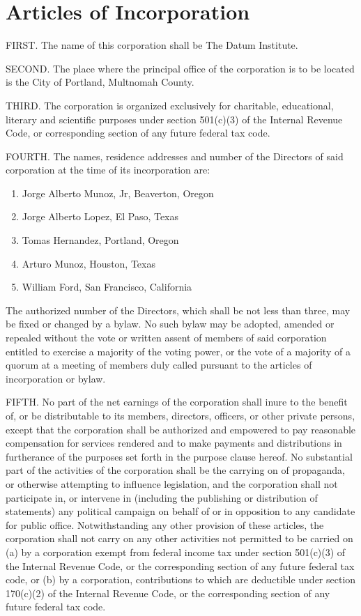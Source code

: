 \section{Articles of Incorporation}

FIRST. The name of this corporation shall be The Datum Institute.

SECOND. The place where the principal office of the corporation is to be located is the City of Portland, Multnomah County.

THIRD. The corporation is organized exclusively for charitable, educational, literary and scientific purposes under section 501(c)(3) of the Internal Revenue Code, or corresponding section of any future federal tax code. 

FOURTH. The names, residence addresses and number of the Directors of said corporation at the time of its incorporation are:

\begin{enumerate}
\item Jorge Alberto Munoz, Jr, Beaverton, Oregon
\item Jorge Alberto Lopez, El Paso, Texas
\item Tomas Hernandez, Portland, Oregon
\item Arturo Munoz, Houston, Texas
\item William Ford, San Francisco, California
\end{enumerate}

The authorized number of the Directors, which shall be not less than three, may be fixed or changed by a bylaw.  No such bylaw may be adopted, amended or repealed without the vote or written assent of members of said corporation entitled to exercise a majority of the voting power, or the vote of a majority of a quorum at a meeting of members duly called pursuant to the articles of incorporation or bylaw.

FIFTH. No part of the net earnings of the corporation shall inure to the benefit of, or be distributable to its members, directors, officers, or other private persons, except that the corporation shall be authorized and empowered to pay reasonable compensation for services rendered and to make payments and distributions in furtherance of the purposes set forth in the purpose clause hereof. No substantial part of the activities of the corporation shall be the carrying on of propaganda, or otherwise attempting to influence legislation, and the corporation shall not participate in, or intervene in (including the publishing or distribution of statements) any political campaign on behalf of or in opposition to any candidate for public office. Notwithstanding any other provision of these articles, the corporation shall not carry on any other activities not permitted to be carried on (a) by a corporation exempt from federal income tax under section 501(c)(3) of the Internal Revenue Code, or the corresponding section of any future federal tax code, or (b) by a corporation, contributions to which are deductible under section 170(c)(2) of the Internal Revenue Code, or the corresponding section of any future federal tax code.

